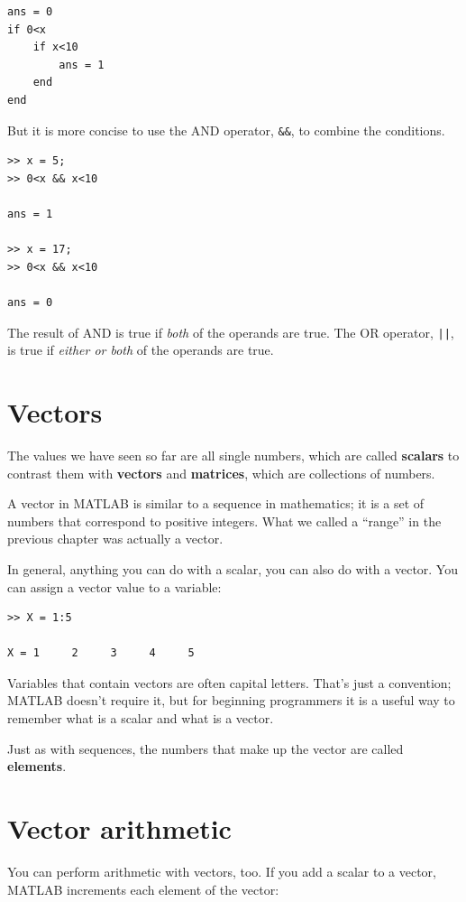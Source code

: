 \documentclass{book}
\begin{document}
\begin{verbatim}
ans = 0
if 0<x
    if x<10
        ans = 1
    end
end
\end{verbatim}

But it is more concise to use the AND operator, {\tt \&\&}, to
combine the conditions.

\begin{verbatim}
>> x = 5;
>> 0<x && x<10

ans = 1

>> x = 17;
>> 0<x && x<10

ans = 0
\end{verbatim}

The result of AND is true if {\em both} of the operands are
true.  The OR operator, {\tt ||}, is true if {\em either or both}
of the operands are true.


\section{Vectors}

The values we have seen so far are all single numbers,
which are called {\bf scalars} to contrast them with {\bf vectors}
and {\bf matrices}, which are collections of numbers.

A vector in MATLAB is similar to a sequence in mathematics;
it is a set of numbers that correspond to positive integers.
What
we called a ``range'' in the previous chapter was actually a
vector.

In general, anything you can do with a scalar, you can also do with
a vector.  You can assign a vector value to a variable:

\begin{verbatim}
>> X = 1:5

X = 1     2     3     4     5
\end{verbatim}

Variables that contain vectors are often capital letters.  That's
just a convention; MATLAB doesn't require it, but for beginning
programmers it is a useful way to remember what is a scalar and
what is a vector.

Just as with sequences, the numbers that make up the vector are called
{\bf elements}.


\section{Vector arithmetic}

You can perform arithmetic with vectors, too.  If you add a scalar
to a vector, MATLAB increments each element of the vector:
\end{document}
